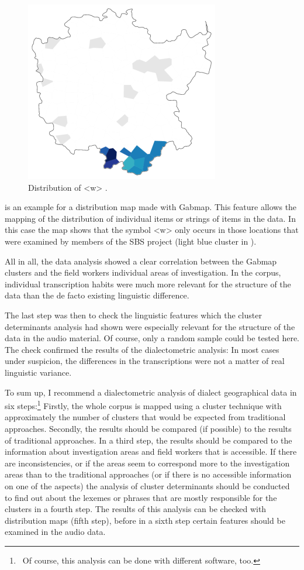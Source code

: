 \documentclass[output=paper]{LSP/langsci}
\begin{document}
\begin{figure}
\includegraphics[width=.5\textwidth]{illustrations/mathus_fig10}
\caption{Distribution of {\textless}w{\textgreater} \citep[226]{mathussek_sprachraume_2014}.}
\label{fig:10}
\end{figure}
  
 is an example for a distribution map made with Gabmap. This feature allows the mapping of the distribution of individual items or strings of items in the data. In this case the map shows that the symbol {\textless}w{\textgreater} only occurs in those locations that were examined by members of the SBS project (light blue cluster in ).

All in all, the data analysis showed a clear correlation between the Gabmap clusters and the field workers{\textquotesingle} individual areas of investigation. In the corpus, individual transcription habits were much more relevant for the structure of the data than the de facto existing linguistic difference.

The last step was then to check the linguistic features which the cluster determinants analysis had shown were especially relevant for the structure of the data in the audio material. Of course, only a random sample could be tested here. The check confirmed the results of the dialectometric analysis: In most cases under suspicion, the differences in the transcriptions were not a matter of real linguistic variance.

To sum up, I recommend a dialectometric analysis of dialect geographical data in six steps:\footnote{\ Of course, this analysis can be done with different software, too.} Firstly, the whole corpus is mapped using a cluster technique with approximately the number of clusters that would be expected from traditional approaches. Secondly, the results should be compared (if possible) to the results of traditional approaches. In a third step, the results should be compared to the information about investigation areas and field workers that is accessible. If there are inconsistencies, or if the areas seem to correspond more to the investigation areas than to the traditional approaches (or if there is no accessible information on one of the aspects) the analysis of cluster determinants should be conducted to find out about the lexemes or phrases that are mostly {\textquotedbl}responsible{\textquotedbl} for the clusters in a fourth step. The results of this analysis can be checked with distribution maps (fifth step), before in a sixth step certain features should be examined in the audio data.
\end{document}
